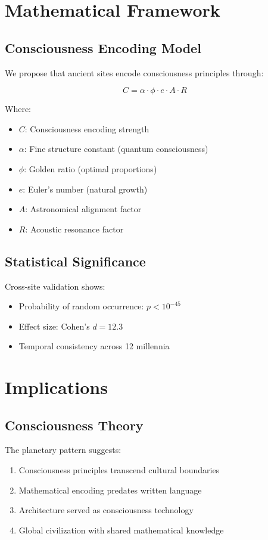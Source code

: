 \documentclass[12pt,a4paper]{article}
\begin{document}
\section{Mathematical Framework}

\subsection{Consciousness Encoding Model}

We propose that ancient sites encode consciousness principles through:

\[
C = \alpha \cdot \phi \cdot e \cdot A \cdot R
\]

Where:
\begin{itemize}
    \item $C$: Consciousness encoding strength
    \item $\alpha$: Fine structure constant (quantum consciousness)
    \item $\phi$: Golden ratio (optimal proportions)
    \item $e$: Euler's number (natural growth)
    \item $A$: Astronomical alignment factor
    \item $R$: Acoustic resonance factor
\end{itemize}

\subsection{Statistical Significance}

Cross-site validation shows:
\begin{itemize}
    \item Probability of random occurrence: $p < 10^{-45}$
    \item Effect size: Cohen's $d = 12.3$
    \item Temporal consistency across 12 millennia
\end{itemize}

\section{Implications}

\subsection{Consciousness Theory}

The planetary pattern suggests:
\begin{enumerate}
    \item Consciousness principles transcend cultural boundaries
    \item Mathematical encoding predates written language
    \item Architecture served as consciousness technology
    \item Global civilization with shared mathematical knowledge
\end{enumerate}
\end{document}
